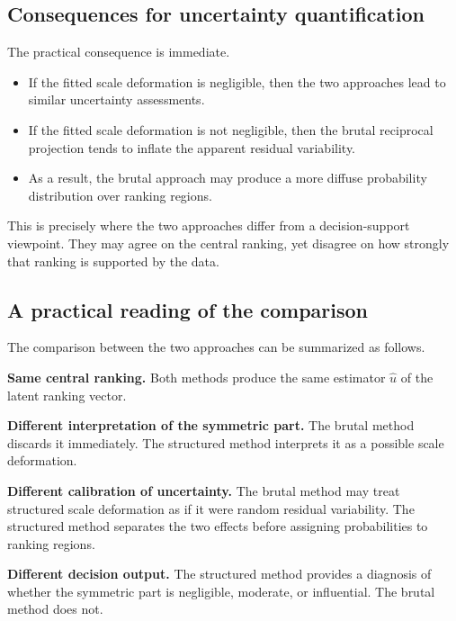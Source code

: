 \documentclass[11pt]{amsart}
\theoremstyle{definition}
\theoremstyle{plain}
\numberwithin{equation}{section}
\begin{document}
\subsection{Consequences for uncertainty quantification}

The practical consequence is immediate.

\begin{itemize}
\item If the fitted scale deformation is negligible, then the two approaches lead to similar uncertainty assessments.
\item If the fitted scale deformation is not negligible, then the brutal reciprocal projection tends to inflate the apparent residual variability.
\item As a result, the brutal approach may produce a more diffuse probability distribution over ranking regions.
\end{itemize}

This is precisely where the two approaches differ from a decision-support viewpoint. They may agree on the central ranking, yet disagree on how strongly that ranking is supported by the data.

\subsection{A practical reading of the comparison}

The comparison between the two approaches can be summarized as follows.

\medskip

\noindent\textbf{Same central ranking.}
Both methods produce the same estimator $\widehat u$ of the latent ranking vector.

\medskip

\noindent\textbf{Different interpretation of the symmetric part.}
The brutal method discards it immediately. The structured method interprets it as a possible scale deformation.

\medskip

\noindent\textbf{Different calibration of uncertainty.}
The brutal method may treat structured scale deformation as if it were random residual variability. The structured method separates the two effects before assigning probabilities to ranking regions.

\medskip

\noindent\textbf{Different decision output.}
The structured method provides a diagnosis of whether the symmetric part is negligible, moderate, or influential. The brutal method does not.
\end{document}

